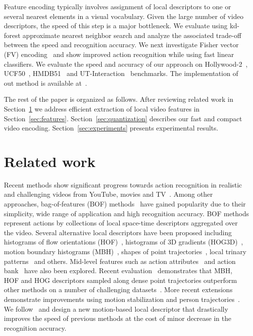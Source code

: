 \documentclass[10pt,twocolumn,letterpaper]{article}
\begin{document}
Feature encoding typically involves assignment of local
descriptors to one or several nearest elements in a visual
vocabulary. Given the large number of video descriptors, the
speed of this step is a major bottleneck. We evaluate using
kd-forest approximate nearest neighbor search \cite{Philbin07}
and analyze the associated trade-off between the speed and
recognition accuracy. We next investigate Fisher vector (FV)
encoding~\cite{Perronnin12} and show improved action recognition while using fast linear classifiers.
We evaluate the speed and accuracy of our approach on
\mbox{Hollywood-2}~\cite{Marszalek09}, UCF50~\cite{Reddy12},
HMDB51~\cite{Kuehne11} and UT-Interaction~\cite{Ryoo10}
benchmarks. The implementation of out method is available at~\cite{projectpage}.

The rest of the paper is organized as follows. 
After reviewing related work in Section~\ref{sec:relatedwork} we address efficient extraction of local video features in
Section~\ref{sec:features}. Section~\ref{sec:quantization}
describes our fast and compact video encoding.
Section~\ref{sec:experiments} presents experimental results.



\section{Related work}
\label{sec:relatedwork}
Recent methods show significant progress towards action
recognition in realistic and challenging videos from YouTube,
movies and
TV~\cite{Laptev08,Laptev07,Liu11,Niebles10,Rodriguez08,Sadanand12,Wang12}.
Among other approaches, bag-of-features (BOF)
methods~\cite{Dollar05,Laptev05,Schuldt04} have gained
popularity due to their simplicity, wide range of application
and high recognition accuracy.
BOF methods represent actions by collections of local space-time descriptors aggregated over the video.
Several alternative local descriptors have been proposed
including histograms of flow orientations (HOF)~\cite{Laptev08},
histograms of 3D gradients
(HOG3D)~\cite{klaser2008spatio,Scovanner07}, motion boundary
histograms (MBH)~\cite{Dalal06,Wang12}, shapes of point
trajectories~\cite{Matikainen09,Messing09,Wang12}, local trinary patterns~\cite{Kliper12,Yeffet09} and others. 
Mid-level features such as action attributes~\cite{Liu11} and action
bank~\cite{Sadanand12} have also been explored. Recent
 evaluation~\cite{Wang12} demonstrates that MBH, HOF
and HOG descriptors sampled along dense point trajectories
outperform other
methods on a number of challenging datasets~\cite{Wang12}. 
More recent extensions demonstrate improvements using motion stabilization and person trajectories~\cite{Jain13,Wang13}.
We follow~\cite{Wang12} and design a new motion-based local
descriptor that drastically improves the speed of previous
methods at the cost of minor decrease in the recognition
accuracy.
\end{document}
